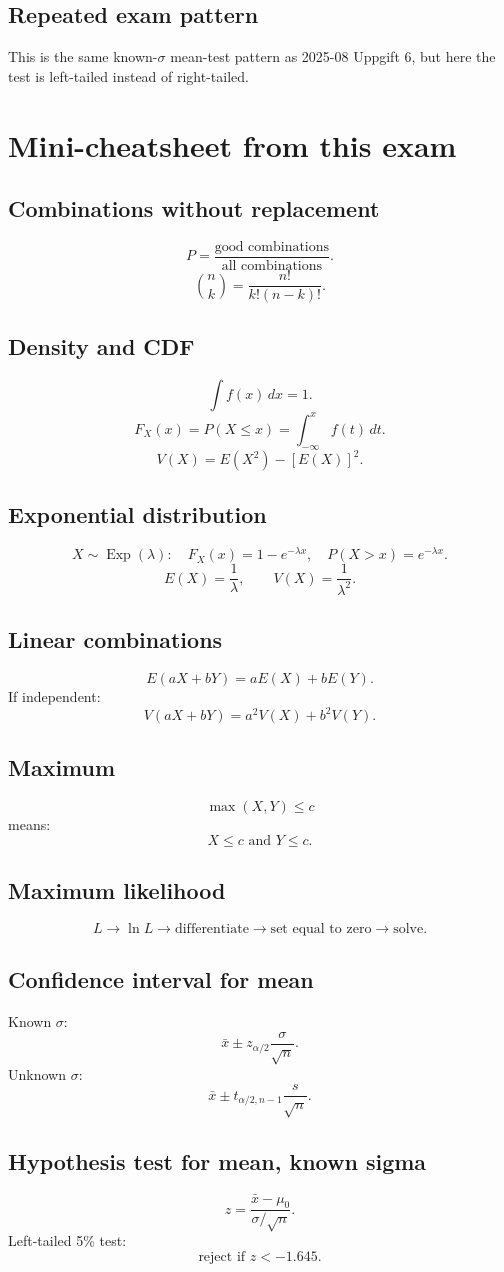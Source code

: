 \documentclass[11pt,a4paper]{article}
\begin{document}
\subsection*{Repeated exam pattern}
This is the same known-\(\sigma\) mean-test pattern as 2025-08 Uppgift 6, but here the test is left-tailed instead of right-tailed.

\section*{Mini-cheatsheet from this exam}

\subsection*{Combinations without replacement}
\[
P=\frac{\text{good combinations}}{\text{all combinations}}.
\]
\[
\binom{n}{k}=\frac{n!}{k!(n-k)!}.
\]

\subsection*{Density and CDF}
\[
\int f(x)\,dx=1.
\]
\[
F_X(x)=P(X\le x)=\int_{-\infty}^{x}f(t)\,dt.
\]
\[
V(X)=E(X^2)-[E(X)]^2.
\]

\subsection*{Exponential distribution}
\[
X\sim\operatorname{Exp}(\lambda):
\quad
F_X(x)=1-e^{-\lambda x},\quad
P(X>x)=e^{-\lambda x}.
\]
\[
E(X)=\frac{1}{\lambda},\qquad V(X)=\frac{1}{\lambda^2}.
\]

\subsection*{Linear combinations}
\[
E(aX+bY)=aE(X)+bE(Y).
\]
If independent:
\[
V(aX+bY)=a^2V(X)+b^2V(Y).
\]

\subsection*{Maximum}
\[
\max(X,Y)\le c
\]
means:
\[
X\le c \text{ and } Y\le c.
\]

\subsection*{Maximum likelihood}
\[
L \rightarrow \ln L \rightarrow \text{differentiate} \rightarrow \text{set equal to zero} \rightarrow \text{solve}.
\]

\subsection*{Confidence interval for mean}
Known \(\sigma\):
\[
\bar{x}\pm z_{\alpha/2}\frac{\sigma}{\sqrt{n}}.
\]
Unknown \(\sigma\):
\[
\bar{x}\pm t_{\alpha/2,n-1}\frac{s}{\sqrt{n}}.
\]

\subsection*{Hypothesis test for mean, known sigma}
\[
z=\frac{\bar{x}-\mu_0}{\sigma/\sqrt{n}}.
\]
Left-tailed 5\% test:
\[
\text{reject if }z<-1.645.
\]
\end{document}
